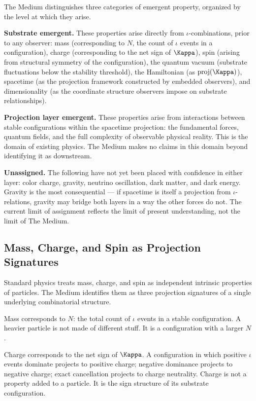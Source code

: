 \documentclass[11pt,letterpaper]{article}
\begin{document}
The Medium distinguishes three categories of emergent property, organized by the level at which they arise.

\textbf{Substrate emergent.} These properties arise directly from \(\iota\)-combinations, prior to any observer: mass (corresponding to \(N\), the count of \(\iota\) events in a configuration), charge (corresponding to the net sign of \(\Kappa\)), spin (arising from structural symmetry of the configuration), the quantum vacuum (substrate fluctuations below the stability threshold), the Hamiltonian (as \(\mathrm{proj}(\Kappa)\)), spacetime (as the projection framework constructed by embedded observers), and dimensionality (as the coordinate structure observers impose on substrate relationships).

\textbf{Projection layer emergent.} These properties arise from interactions between stable configurations within the spacetime projection: the fundamental forces, quantum fields, and the full complexity of observable physical reality. This is the domain of existing physics. The Medium makes no claims in this domain beyond identifying it as downstream.

\textbf{Unassigned.} The following have not yet been placed with confidence in either layer: color charge, gravity, neutrino oscillation, dark matter, and dark energy. Gravity is the most consequential --- if spacetime is itself a projection from \(\iota\)-relations, gravity may bridge both layers in a way the other forces do not. The current limit of assignment reflects the limit of present understanding, not the limit of The Medium.
\subsection{Mass, Charge, and Spin as Projection Signatures}
\label{sec:orgeed212c}

Standard physics treats mass, charge, and spin as independent intrinsic properties of particles. The Medium identifies them as three projection signatures of a single underlying combinatorial structure.

Mass corresponds to \(N\): the total count of \(\iota\) events in a stable configuration. A heavier particle is not made of different stuff. It is a configuration with a larger \(N\).

Charge corresponds to the net sign of \(\Kappa\). A configuration in which positive \(\iota\) events dominate projects to positive charge; negative dominance projects to negative charge; exact cancellation projects to charge neutrality. Charge is not a property added to a particle. It is the sign structure of its substrate configuration.
\end{document}
